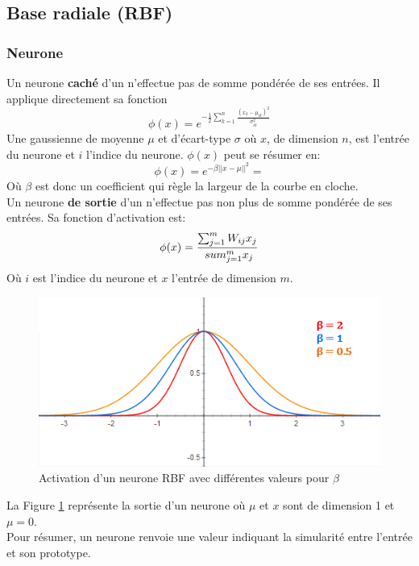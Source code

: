 \subsection{Base radiale (RBF)}
\newcommand{\factnorm}{\sum_{r=1}^{m}x_{r}}
\subsubsection{Neurone}
Un neurone \textbf{caché} d'un \rbf n'effectue pas de somme pondérée de ses entrées. Il applique directement sa fonction
\[\phi(x) = e^{-\frac{1}{2}\sum_{k=1}^{n}\frac{(x_k-\mu_{ik})^2}{\sigma_{ik}^{2}}}\]
Une gaussienne de moyenne $\mu$ et d'écart-type $\sigma$ où $x$, de dimension $n$, est l'entrée du neurone et $i$ l'indice du neurone.
$\phi(x)$ peut se résumer en: \[\phi(x) = e^{-\beta||x-\mu||^2} = \]
Où $\beta$ est donc un coefficient qui règle la largeur de la courbe en cloche.\\

Un neurone \textbf{de sortie} d'un \rbf n'effectue pas non plus de somme pondérée de ses entrées. Sa fonction d'activation est:
\[\phi(x) = \frac{\sum_{j=1}^{m}W_{ij}x_{j}}{\\sum_{j=1}^{m}x_{j}}\]
Où $i$ est l'indice du neurone et $x$ l'entrée de dimension $m$.
\begin{figure}
 \centering
 \includegraphics[scale=0.7]{../figures/RBFactivation.png}
 \caption{Activation d'un neurone RBF avec différentes valeurs pour $\beta$}
 \label{rbfactivation}
\end{figure}
La Figure \ref{rbfactivation} représente la sortie d'un neurone \rbf où $\mu$ et $x$ sont de dimension 1 et $\mu = 0$.\\
Pour résumer, un neurone \rbf renvoie une valeur indiquant la simularité entre l'entrée et son prototype.
